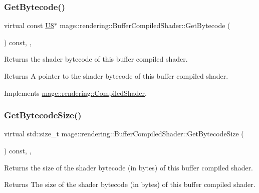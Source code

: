 \subsubsection{\texorpdfstring{Get\+Bytecode()}{GetBytecode()}}
{\footnotesize\ttfamily virtual const \mbox{\hyperlink{namespacemage_a30677c03d683c4c35630c25f6ff3fb7f}{U8}}$\ast$ mage\+::rendering\+::\+Buffer\+Compiled\+Shader\+::\+Get\+Bytecode (\begin{DoxyParamCaption}{ }\end{DoxyParamCaption}) const\hspace{0.3cm}{\ttfamily [override]}, {\ttfamily [virtual]}, {\ttfamily [noexcept]}}

Returns the shader bytecode of this buffer compiled shader.

\begin{DoxyReturn}{Returns}
A pointer to the shader bytecode of this buffer compiled shader. 
\end{DoxyReturn}


Implements \mbox{\hyperlink{classmage_1_1rendering_1_1_compiled_shader_a469367d98fe910537a02868df0c85ec4}{mage\+::rendering\+::\+Compiled\+Shader}}.

\mbox{\label{classmage_1_1rendering_1_1_buffer_compiled_shader_a8c7815186d97444a5bcd009307ed8b9d}} 
\subsubsection{\texorpdfstring{Get\+Bytecode\+Size()}{GetBytecodeSize()}}
{\footnotesize\ttfamily virtual std\+::size\+\_\+t mage\+::rendering\+::\+Buffer\+Compiled\+Shader\+::\+Get\+Bytecode\+Size (\begin{DoxyParamCaption}{ }\end{DoxyParamCaption}) const\hspace{0.3cm}{\ttfamily [override]}, {\ttfamily [virtual]}, {\ttfamily [noexcept]}}

Returns the size of the shader bytecode (in bytes) of this buffer compiled shader.

\begin{DoxyReturn}{Returns}
The size of the shader bytecode (in bytes) of this buffer compiled shader. 
\end{DoxyReturn}


